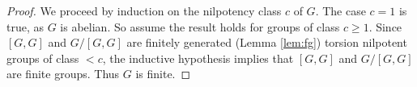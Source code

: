 \begin{proof}
We proceed by induction on the nilpotency class $c$ of $G$. The case
$c=1$ is true, as $G$ is abelian. So assume the result holds for 
groups of class $c\geq1$. Since $[G,G]$ and $G/[G,G]$ are 
finitely generated (Lemma \ref{lem:fg}) torsion 
nilpotent groups of class  
$<c$, the inductive hypothesis implies that
$[G,G]$ and $G/[G,G]$ are finite groups. Thus 
$G$ is finite. %
\end{proof}

%
%
%




